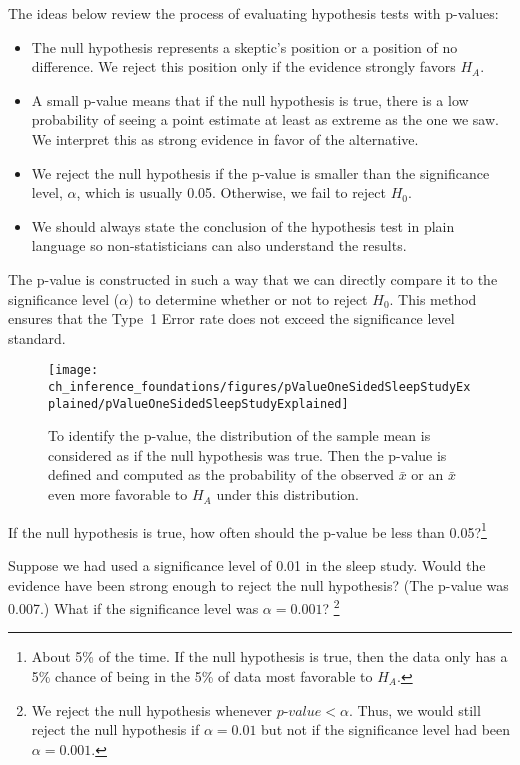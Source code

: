 The ideas below review the process of evaluating hypothesis tests with p-values:
\begin{itemize}
\setlength{\itemsep}{0mm}
\item The null hypothesis represents a skeptic's position or a position of no difference. We reject this position only if the evidence strongly favors $H_A$.
\item A small p-value means that if the null hypothesis is true, there is a low probability of seeing a point estimate at least as extreme as the one we saw. We interpret this as strong evidence in favor of the alternative.
\item We reject the null hypothesis if the p-value is smaller than the significance level, $\alpha$, which is usually 0.05. Otherwise, we fail to reject $H_0$.
\item We should always state the conclusion of the hypothesis test in plain language so non-statisticians can also understand the results.
\end{itemize}

The p-value is constructed in such a way that we can directly compare it to the significance level ($\alpha$) to determine whether or not to reject $H_0$. This method ensures that the Type~1 Error rate does not exceed the significance level standard. 

\begin{figure}[ht]
   \centering
   \texttt{[image: ch\_inference\_foundations/figures/pValueOneSidedSleepStudyExplained/pValueOneSidedSleepStudyExplained]}
   \caption{To identify the p-value, the distribution of the sample mean is considered as if the null hypothesis was true. Then the p-value is defined and computed as the probability of the observed $\bar{x}$ or an $\bar{x}$ even more favorable to $H_A$ under this distribution.}
   \label{pValueOneSidedSleepStudyExplained}
\end{figure}

\begin{exercise}
If the null hypothesis is true, how often should the p-value be less than 0.05?\footnote{About 5\% of the time. If the null hypothesis is true, then the data only has a 5\% chance of being in the 5\% of data most favorable to $H_A$.}
\end{exercise}

\begin{exercise}
Suppose we had used a significance level of 0.01 in the sleep study. Would the evidence have been strong enough to reject the null hypothesis? (The p-value was 0.007.) What if the significance level was $\alpha = 0.001$? \footnote{We reject the null hypothesis whenever $p$-$value < \alpha$. Thus, we would still reject the null hypothesis if $\alpha = 0.01$ but not if the significance level had been $\alpha = 0.001$.}
\end{exercise}

